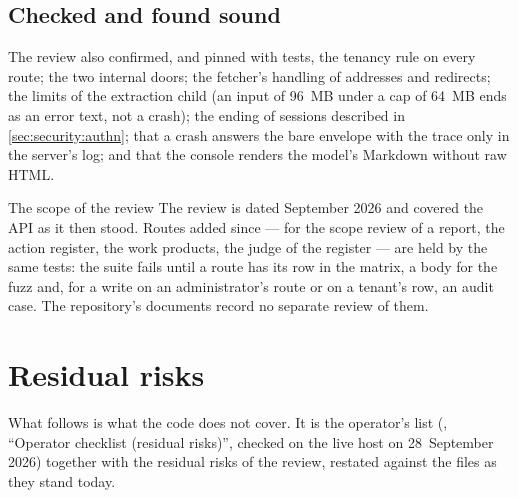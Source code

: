 \subsection{Checked and found sound}

The review also confirmed, and pinned with tests, the tenancy rule on every route; the two
internal doors; the fetcher's handling of addresses and redirects; the limits of the
extraction child (an input of 96~MB under a cap of 64~MB ends as an error text, not a
crash); the ending of sessions described in \cref{sec:security:authn}; that a crash answers
the bare envelope  with the trace only in the server's log; and that the
console renders the model's Markdown without raw HTML.

\begin{lessonbox}{The scope of the review}
The review is dated September 2026 and covered the API as it then stood. Routes added since
--- for the scope review of a report, the action register, the work products, the judge of
the register --- are held by the same tests: the suite fails until a route has its row in the
matrix, a body for the fuzz and, for a write on an administrator's route or on a tenant's
row, an audit case. The repository's documents record
no separate review of them.
\end{lessonbox}


\section{Residual risks}\label{sec:security:residual}

What follows is what the code does not cover. It is the operator's list
(, \enquote{Operator checklist (residual risks)}, checked on the
live host on 28~September 2026) together with the residual risks of the review, restated
against the files as they stand today.

